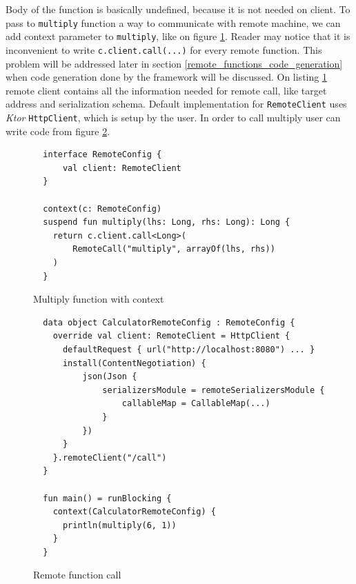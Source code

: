 \documentclass[a4paper,11pt,oneside]{article}
\newcommand{\term}[1]{\textit{#1}}
\newcommand{\kotlini}[1]{\texttt{#1}}
\begin{document}
Body of the function is basically undefined, because it is not needed on client. To pass to
\kotlini{multiply} function a way to communicate with remote machine, we can add context parameter
to \kotlini{multiply}, like on figure \ref{multiply_client_context}. Reader may notice that it is
inconvenient to write \kotlini{c.client.call(...)} for every remote function. This problem will be
addressed later in section \ref{remote_functions_code_generation} when code generation done by the
framework will be discussed. On listing \ref{multiply_client_context} remote client contains all the information needed for remote call, like target address and
serialization schema. Default implementation for \kotlini{RemoteClient} uses \term{Ktor}
\cite{noauthor_ktor_nodate} \kotlini{HttpClient}, which is setup by the user. In order to call
multiply user can write code from figure \ref{multiply_client_context_call}.

\begin{figure}[!h]
  \begin{verbatim}
  interface RemoteConfig {
      val client: RemoteClient
  }

  context(c: RemoteConfig)
  suspend fun multiply(lhs: Long, rhs: Long): Long {
    return c.client.call<Long>(
        RemoteCall("multiply", arrayOf(lhs, rhs))
    )
  }
  \end{verbatim}
  \caption{Multiply function with context}\label{multiply_client_context}
\end{figure}

\begin{figure}[!h]
  \begin{verbatim}
  data object CalculatorRemoteConfig : RemoteConfig {
    override val client: RemoteClient = HttpClient {
      defaultRequest { url("http://localhost:8080") ... }
      install(ContentNegotiation) {
          json(Json {
              serializersModule = remoteSerializersModule {
                  callableMap = CallableMap(...)
              }
          })
      }
    }.remoteClient("/call")
  }

  fun main() = runBlocking {
    context(CalculatorRemoteConfig) {
      println(multiply(6, 1))
    }
  }
  \end{verbatim}
  \caption{Remote function call}\label{multiply_client_context_call}
\end{figure}
\end{document}
